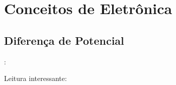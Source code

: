 
\section{Conceitos de Eletrônica}


\subsection{Diferença de Potencial}


\begin{frame}[b]{\insertsection: \insertsubsection}

	\vfill
	Leitura interessante: 

\end{frame}




